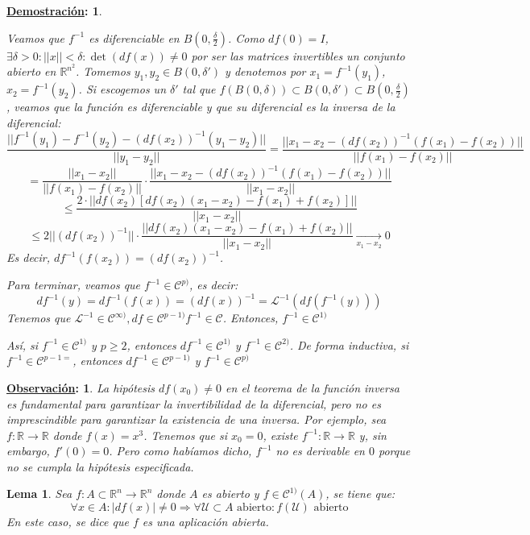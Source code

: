 \documentclass[10pt,a4paper,openright]{book}
\theoremstyle{break}
\newtheorem*{lema}{Lema}
\newtheorem*{demo}{\underline{Demostración}:}
\newtheorem*{obs}{\underline{Observación}:}
\begin{document}
\begin{demo}
\begin{itemize}
Veamos que $f^{-1}$ es diferenciable en $B(0, \frac{\delta}{2})$. Como $df(0) = I$, $\exists \delta > 0 : || x || < \delta : \det(df(x)) \neq 0$ por ser las matrices invertibles un conjunto abierto en $\mathbb{R}^{n^2}$. Tomemos $y_1, y_2 \in B(0, \delta')$ y denotemos por $x_1 = f^{-1} (y_1)$, $x_2 = f^{-1}(y_2)$. Si escogemos un $\delta'$ tal que $f(B(0, \delta)) \subset B(0, \delta') \subset B(0, \frac{\delta}{2})$, veamos que la función es diferenciable y que su diferencial es la inversa de la diferencial:
$$\frac{||f^{-1}(y_1) - f^{-1}(y_2) - \left( df(x_2) \right)^{-1} (y_1 - y_2) ||}{|| y_1 - y_2 ||} = \frac{|| x_1 - x_2 -  \left( df(x_2) \right)^{-1} (f(x_1) - f(x_2)) ||}{|| f(x_1) - f(x_2) ||}$$
$$= \frac{||x_1 - x_2 || }{|| f(x_1) - f(x_2) ||} \cdot \frac{|| x_1 - x_2 -  \left( df(x_2) \right)^{-1} (f(x_1) - f(x_2)) ||}{|| x_1 - x_2 ||}$$
$$\leq \frac{2 \cdot || df(x_2) [df(x_2) (x_1 - x_2) - f(x_1) + f(x_2)]||}{|| x_1 - x_2 ||}$$
$$\leq 2 ||(df(x_2))^{-1}|| \cdot \frac{|| df(x_2) (x_1 - x_2) - f(x_1) + f(x_2) || }{|| x_1 - x_2 ||} \xrightarrow[x_1- x_2]{} 0$$
Es decir, $df^{-1}(f(x_2)) = (df(x_2))^{-1}$.

Para terminar, veamos que $f^{-1} \in \mathcal{C}^{p)}$, es decir:
$$df^{-1} (y) = df^{-1} (f(x)) = (df(x))^{-1} = \mathcal{L}^{-1} (df(f^{-1}(y)))$$
Tenemos que $\mathcal{L}^{-1} \in \mathcal{C}^{\infty )}, df \in \mathcal{C}^{p-1)} f^{-1} \in \mathcal{C}$. Entonces, $f^{-1} \in \mathcal{C}^{1)}$

Así, si $f^{-1} \in \mathcal{C}^{1)}$ y  $p \geq 2$, entonces $df^{-1} \in \mathcal{C}^{1)}$ y $f^{-1} \in \mathcal{C}^{2)}$. De forma inductiva, si $f^{-1} \in \mathcal{C}^{p-1=}$, entonces $df^{-1} \in \mathcal{C}^{p-1)}$ y $f^{-1} \in \mathcal{C}^{p)}$
\end{itemize}
\end{demo}

\begin{obs}
La hipótesis $df(x_0) \neq 0$ en el teorema de la función inversa es fundamental para garantizar la invertibilidad de la diferencial, pero 
no es imprescindible para garantizar la existencia de una inversa. Por ejemplo, sea $f:\mathbb{R}\longrightarrow \mathbb{R}$ donde $f(x) = x^3$. Tenemos que  si $x_0 = 0$, existe $f^{-1} : \mathbb{R} \to \mathbb{R}$ y, sin embargo, $f'(0) = 0$. Pero como habíamos dicho, $f^{-1}$ no es derivable en $0$ porque no se cumpla la hipótesis especificada.
\end{obs}

\begin{lema}
Sea $f: A \subset \mathbb{R}^n \to \mathbb{R}^n$ donde $A$ es abierto y $f \in \mathcal{C}^{1)}(A)$, se tiene que:
$$\forall x \in A : |df(x)| \neq 0 \Rightarrow \forall \mathcal{U} \subset A \mbox{ abierto}: f(\mathcal{U})\mbox{ abierto}$$
En este caso, se dice que $f$ es una aplicación abierta.
\end{lema}
\end{document}

